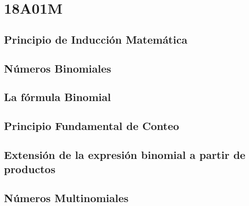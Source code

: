 \chapter{18A01M}
\section{Principio de Inducci\'{o}n Matem\'{a}tica}

\section{N\'{u}meros Binomiales}

\section{La f\'{o}rmula Binomial}

\section{Principio Fundamental de Conteo}

\section{Extensi\'{o}n de la expresi\'{o}n binomial a partir de productos}

\section{N\'{u}meros Multinomiales}
